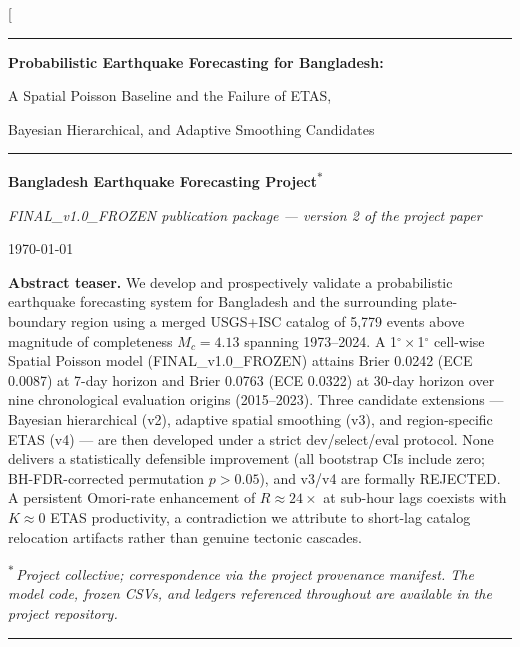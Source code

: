 \documentclass[10pt,a4paper,twocolumn]{article}
\begin{document}
\twocolumn[
\begin{@twocolumnfalse}
\centering
\vspace*{0.4em}
{\color{accent}\rule{\linewidth}{1.2pt}}\par\vspace{0.6em}
{\LARGE\bfseries\color{accent} Probabilistic Earthquake Forecasting for Bangladesh:\par\vspace{2pt}
A Spatial Poisson Baseline and the Failure of ETAS,\par
Bayesian Hierarchical, and Adaptive Smoothing Candidates\par}\vspace{0.6em}
{\color{accent}\rule{\linewidth}{0.6pt}}\par\vspace{1.0em}
{\large\bfseries Bangladesh Earthquake Forecasting Project\textsuperscript{$\ast$}}\par\vspace{0.4em}
{\small\itshape FINAL\_v1.0\_FROZEN publication package --- version 2 of the project paper}\par\vspace{0.3em}
{\small\today}\par\vspace{0.8em}
\begin{minipage}{0.86\linewidth}
\small\textbf{Abstract teaser.} We develop and prospectively validate a probabilistic earthquake forecasting system for Bangladesh and the surrounding plate-boundary region using a merged USGS+ISC catalog of 5{,}779 events above magnitude of completeness $M_c=4.13$ spanning 1973--2024. A 1$^\circ\times$1$^\circ$ cell-wise Spatial Poisson model (FINAL\_v1.0\_FROZEN) attains Brier 0.0242 (ECE 0.0087) at 7-day horizon and Brier 0.0763 (ECE 0.0322) at 30-day horizon over nine chronological evaluation origins (2015--2023). Three candidate extensions --- Bayesian hierarchical (v2), adaptive spatial smoothing (v3), and region-specific ETAS (v4) --- are then developed under a strict dev/select/eval protocol. None delivers a statistically defensible improvement (all bootstrap CIs include zero; BH-FDR-corrected permutation $p>0.05$), and v3/v4 are formally REJECTED. A persistent Omori-rate enhancement of $R\approx24\times$ at sub-hour lags coexists with $K\approx0$ ETAS productivity, a contradiction we attribute to short-lag catalog relocation artifacts rather than genuine tectonic cascades.
\end{minipage}\par\vspace{0.6em}
{\footnotesize\textsuperscript{$\ast$}\,\itshape Project collective; correspondence via the project provenance manifest. The model code, frozen CSVs, and ledgers referenced throughout are available in the project repository.}\par\vspace{0.4em}
{\color{accent}\rule{\linewidth}{0.4pt}}\par
\vspace{1.0em}
\end{@twocolumnfalse}
\end{document}
